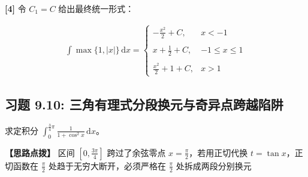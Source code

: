 \documentclass[11pt,a4paper,UTF8]{ctexart}
\begin{document}
\begin{solbox}[分步推导与答题规范]
\textbf{[4]} 令 $C_1 = C$ 给出最终统一形式：


\begin{align*}
\int \max\{1, |x|\}\,\mathrm{d}x = \begin{cases} -\frac{x^2}{2} + C, & x < -1 \\ \\ x + \frac{1}{2} + C, & -1 \leqslant x \leqslant 1 \\ \\ \frac{x^2}{2} + 1 + C, & x > 1 \end{cases}
\end{align*}

\end{solbox}


\subsection{习题 9.10: 三角有理式分段换元与奇异点跨越陷阱}

求定积分 $\int_0^{\frac{3}{4}\pi} \frac{1}{1+\cos^2 x}\,\mathrm{d}x$。

\textbf{\color{DeepPurple}【思路点拨】} 区间 $[0, \frac{3\pi}{4}]$ 跨过了余弦零点 $x = \frac{\pi}{2}$，若用正切代换 $t = \tan x$，正切函数在 $\frac{\pi}{2}$ 处趋于无穷大断开，必须严格在 $\frac{\pi}{2}$ 处拆成两段分别换元
\end{document}
